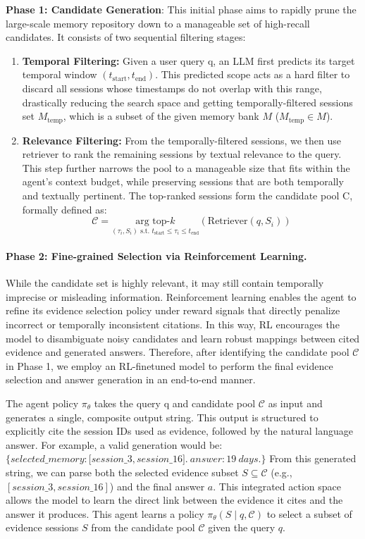 \documentclass{article} %
\begin{document}
\textbf{Phase 1: Candidate Generation}: 
This initial phase aims to rapidly prune the large-scale memory repository down to a manageable set of high-recall candidates. It consists of two sequential filtering stages:
\begin{enumerate}
\item \textbf{Temporal Filtering:} Given a user query q, an LLM first predicts its target temporal window $(t_{\text{start}}, t_{\text{end}})$. This predicted scope acts as a hard filter to discard all sessions whose timestamps do not overlap with this range, drastically reducing the search space and getting temporally-filtered sessions set $M_\text{temp}$, which is a subset of the given memory bank $M$ ($M_\text{temp} \in M$).
\item \textbf{Relevance Filtering:} From the temporally-filtered sessions, we then use retriever to rank the remaining sessions by textual relevance to the query. This step further narrows the pool to a manageable size that fits within the agent's context budget, while preserving sessions that are both temporally and textually pertinent. The top-ranked sessions form the candidate pool C, formally defined as:
\begin{equation}
\mathcal{C} = \underset{(\tau_i, S_i) \text{ s.t. } t_{\text{start}} \le \tau_i \le t_{\text{end}}}{\text{arg top-}k} \left( \text{Retriever}(q, S_i) \right)
\end{equation}
\end{enumerate}
\paragraph{Phase 2: Fine-grained Selection via Reinforcement Learning.}
While the candidate set is highly relevant, it may still contain temporally imprecise or misleading information. Reinforcement learning enables the agent to refine its evidence selection policy under reward signals that directly penalize incorrect or temporally inconsistent citations. In this way, RL encourages the model to disambiguate noisy candidates and learn robust mappings between cited evidence and generated answers. Therefore, after identifying the candidate pool $\mathcal{C}$ in Phase 1, we employ an RL-finetuned model to perform the final evidence selection and answer generation in an end-to-end manner.

The agent policy $\pi_\theta$ takes the query q and candidate pool $\mathcal{C}$ as input and generates a single, composite output string. This output is structured to explicitly cite the session IDs used as evidence, followed by the natural language answer. For example, a valid generation would be:
$\{selected\_memory: \lbrack session\_3, session\_16\rbrack.\ answer: 19\ days.\}$ From this generated string, we can parse both the selected evidence subset \( S \subseteq \mathcal{C} \) (e.g., $[session\_3, session\_16]$) and the final answer \( a \). This integrated action space allows the model to learn the direct link between the evidence it cites and the answer it produces. This agent learns a policy $\pi_\theta(S \mid q, \mathcal{C})$ to select a subset of evidence sessions $S$ from the candidate pool $\mathcal{C}$ given the query $q$.
\end{document}
